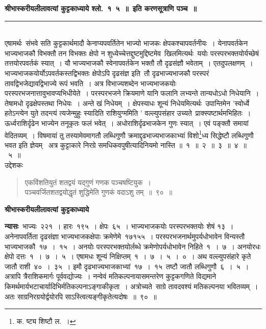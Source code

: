 \documentclass[11pt, openany]{book}
\begin{document}
\centering
\textbf{श्रीभास्करीयलीलावत्यां कुट्टकाध्याये श्लो.~१\textendash\ ५~॥~इति करणसूत्राणि पञ्च~॥\\}

\rule{0.2\linewidth}{1.0pt}\\

\vspace{1cm}
\justifying
\indent
एषामर्थः\textendash\ संभवे सति कुट्टकार्थमादौ केनाप्यपवर्तितेन भाज्यो भाजकः क्षेपकश्चापवर्तनीयः~। येनापवर्तकेन भाज्यभाजकौ विभक्तौ तन विभक्तः क्षेपो न शुध्येच्चेत्तद्दुष्टमुद्दिष्टमेव\textendash\ खिलमित्यर्थः\textendash\ ययोः परस्परभक्तयोर्यच्छेषं तत्तयोरपवर्तकं स्यात्~। यौ भाज्यभाजकौ स्वेनापवर्तकेन भक्तौ तौ दृढसंज्ञौ भवेताम्~। एतदुपलक्षणम्~। भाज्यभाजकयोर्योऽपवर्तकस्तद्विभक्तः क्षेपोऽपि दृढसंज्ञ इति\textendash\ तौ दृढभाज्यभाजकौ परस्परं तावद्विभजेद्यावद्विभाज्ये रूपं भवति~। अत्र विभाज्यशब्देन भाज्यभाजकयोः परस्परभजनात्तावुभावप्यभिधीयेते~। परस्परभजने क्रियमाणे यानि फलानि लभ्यन्ते तान्यधोऽधो निधेयानि~। तेषामधो दृढक्षेपस्तथा निधेयः~। अन्ते खं निधेयम्~। क्षेपस्याधः शून्यं निधेयमित्यर्थः\textendash\ उपान्तिमेन 'स्वोर्ध्वे हतेऽन्त्येन युते तदन्त्यं त्यजेन्मुहुः स्यादिति राशियुग्ममिति ' वल्ल्युपसंहार उच्यते\textendash\ प्राक्स्पष्टार्थमभिहितः~। ऊर्ध्वराशिर्दृढेन भाज्येन तनूकृतः फलं भवेत्~। अधोराशिर्दृढभाजकेन गुणः स्यात्~। एवं पङ्क्तौ समायां वेदितव्यम्~। विषमायां तु तस्यामेवमागतौ लब्धिगुणौ क्रमाद्दृढभाज्यभाजकाभ्यां विशो\renewcommand\thefootnote{१}\footnote{क. ष्ट्य शिष्टौ ल.~।}ध्य सिद्धेष्टौ लब्धिगुणौ भवत इति ज्ञेयम् \textendash\ अत्र कुट्टाकारे निरग्रे समधिकवपुषीत्यादिनियमो नास्ति ॥~१~॥~२~॥~३~॥~४~॥~५~॥\\

उद्देशकः\textendash
\begin{quote}
{\ku एकविंशतियुतं शतद्वयं यद्गुणं गणक पञ्चषष्टियुक~।\\
पञ्चवर्जितशतद्वयोद्धृतं शुद्धिमेति गुणकं वदाऽशु तम्~॥~९०~॥}
\end{quote}

\textbf{श्रीभास्करीयलीलावत्यां कुट्टकाध्याये\textendash }


\newpage
\thispagestyle{fancy}
\fancyhf{}

\indent
\textbf{न्यासः\textendash\ }भाज्यः~२२१~। हारः~१९५~। क्षेपः~६५~। भाज्यभाजकयोः
परस्परभक्तयोः शेषं १३~। अनेनापवर्तिता दृढसंज्ञा भाज्यभाजकक्षेपाः क्रमेणेमे~१७\textendash१५\textendash५~। परस्परभजनार्थमुपर्यधोभावेन विन्यस्तौ भाज्यभाजकौ~१७~।~१५~। अनयोः परस्परभक्तयोर्लब्धे क्रमेणोपर्यधोभावेन निहिते~१~।~७~। अनयोरधः क्षेपो दत्तः~१~।~७~।~५~। एषामधः शून्यं निक्षिप्तम्~१~।~७~।~५~।~०~। अथ वल्ल्युपसंहारे कृते जातौ राशी~४०~।~३५~। इमौ दृढभाज्यभाजकाभ्यां~१७~।~१५~तष्टौ जातौ लब्धिगुणौ~६~।~५~। अत्रापि त्रैराशिकमार्गः पूर्ववद्योज्यः~। नन्वेवं मतिकल्पनायासमन्तरेण कुट्टकगणिते विद्यमाने किमर्थमार्यभटाचार्यादिभिर्मतिकल्पनाऽङ्गाकीकृता~। अत्रोच्यते\textendash\ साग्रे तावदवश्यं मतिकल्पनया भवितव्यम्~। अतः साग्रनिरग्रयोर्द्वयोरपि साऽस्त्वित्यङ्गीकृतेत्यदोषः~॥~९०~॥\\
\end{document}
